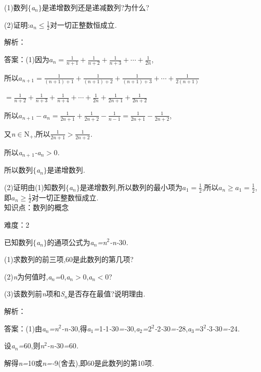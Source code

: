 \documentclass{article} %
\begin{document}
 (1)数列$\mathrm{\{}$\textit{a${}_{n}$}$\mathrm{\}}$是递增数列还是递减数列?为什么?

 (2)证明:$a_n \le \frac{1}{2}$对一切正整数恒成立\textit{.}

解析：

 答案：(1)因为$a_n = \frac{1}{n+1}+\frac{1}{n+2}+\frac{1}{n+3}+\cdots+\frac{1}{2n}$,

所以$a_{n+1} = \frac{1}{(n+1)+1}+\frac{1}{(n+1)+2}+\frac{1}{(n+1)+3}+\cdots +\frac{1}{2(n+1)}$

$=\frac{1}{n+2}+\frac{1}{n+3}+\frac{1}{n+4}+\cdots +\frac{1}{2n}+\frac{1}{2n+1}+\frac{1}{2n+2}$

所以$a_{n+1}-a_n = \frac{1}{2n+1}+\frac{1}{2n+2}-\frac{1}{n-1}=\frac{1}{2n+1}-\frac{1}{2n+2}$,

又\textit{n}$\mathrm{\in}$N\textit{${}_{+}$},所以$\frac{1}{2n+1}>\frac{1}{2n+2}$\textit{.}

所以\textit{a${}_{n+}$}${}_{1}$\textit{-a${}_{n}$$>$}0\textit{.}

所以数列$\mathrm{\{}$\textit{a${}_{n}$}$\mathrm{\}}$是递增数列\textit{.}

 (2)证明由(1)知数列$\mathrm{\{}$\textit{a${}_{n}$}$\mathrm{\}}$是递增数列,所以数列的最小项为$a_1 = \frac{1}{2}$,所以$a_n\ge a_1=\frac{1}{2}$,即$a_n \ge \frac{1}{2}$对一切正整数恒成立\textit{.} \\

知识点：数列的概念

难度：2

 已知数列$\mathrm{\{}$\textit{a${}_{n}$}$\mathrm{\}}$的通项公式为\textit{a${}_{n}$=n}${}^{2}$\textit{-n-}30\textit{.}

(1)求数列的前三项,60是此数列的第几项?

 (2)\textit{n}为何值时,\textit{a${}_{n}$=}0,\textit{a${}_{n}$$>$}0,\textit{a${}_{n}$$<$}0?

 (3)该数列前\textit{n}项和\textit{S${}_{n}$}是否存在最值?说明理由\textit{.}

解析：

  答案：(1)由\textit{a${}_{n}$=n}${}^{2}$\textit{-n-}30,得\textit{a}${}_{1}$\textit{=}1\textit{-}1\textit{-}30\textit{=-}30,\textit{a}${}_{2}$\textit{=}2${}^{2}$\textit{-}2\textit{-}30\textit{=-}28,\textit{a}${}_{3}$\textit{=}3${}^{2}$\textit{-}3\textit{-}30\textit{=-}24\textit{.}

设\textit{a${}_{n}$=}60,则\textit{n}${}^{2}$\textit{-n-}30\textit{=}60\textit{.}

解得\textit{n=}10或\textit{n=-}9(舍去),即60是此数列的第10项\textit{.}
\end{document}
